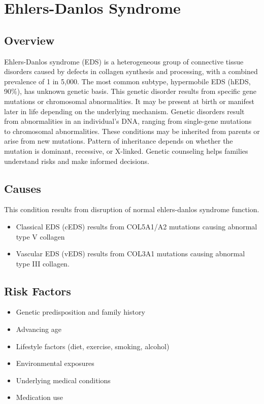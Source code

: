 \chapter{Ehlers-Danlos Syndrome}
\label{sec:Ehlers-Danlos Syndrome}

\section{Overview}
Ehlers-Danlos syndrome (EDS) is a heterogeneous group of connective tissue disorders caused by defects in collagen synthesis and processing, with a combined prevalence of 1 in 5,000. The most common subtype, hypermobile EDS (hEDS, 90\%), has unknown genetic basis. This genetic disorder results from specific gene mutations or chromosomal abnormalities. It may be present at birth or manifest later in life depending on the underlying mechanism. Genetic disorders result from abnormalities in an individual's DNA, ranging from single-gene mutations to chromosomal abnormalities. These conditions may be inherited from parents or arise from new mutations. Pattern of inheritance depends on whether the mutation is dominant, recessive, or X-linked. Genetic counseling helps families understand risks and make informed decisions.
\section{Causes}
This condition results from disruption of normal ehlers-danlos syndrome function.

\begin{itemize}[noitemsep]
  \item Classical EDS (cEDS) results from COL5A1/A2 mutations causing abnormal type V collagen
  \item Vascular EDS (vEDS) results from COL3A1 mutations causing abnormal type III collagen.
\end{itemize}
\section{Risk Factors}


\begin{itemize}[noitemsep]
  \item Genetic predisposition and family history
  \item Advancing age
  \item Lifestyle factors (diet, exercise, smoking, alcohol)
  \item Environmental exposures
  \item Underlying medical conditions
  \item Medication use
\end{itemize}
